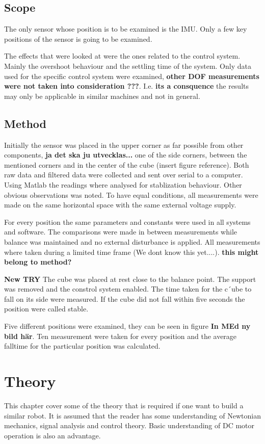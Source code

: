 \documentclass[a4paper,11pt]{kth-mag}
\begin{document}
\section{Scope}
The only sensor whose position is to be examined is the IMU. Only a few key positions of the sensor is going to be examined.

The effects that were looked at were the ones related to the control system. Mainly the overshoot behaviour and the settling time of the system. Only data used for the specific control system were examined, \textbf{other DOF measurements were not taken into consideration ???}. I.e. \textbf{its a consquence} the results may only be applicable in similar machines and not in general.



\section{Method}
Initially the sensor was placed in the upper corner as far possible from other components, \textbf{ja det ska ju utvecklas...} one of the side corners, between the mentioned corners and in the center of the cube (insert figure reference). Both raw data and filtered data were collected and sent over serial to a computer. Using Matlab \cite{MATLAB:2014} the readings where analysed for stablization behaviour. Other obvious observations was noted. To have equal conditions, all measurements were made on the same horizontal space with the same external voltage supply.

For every position the same parameters and constants were used in all systems and software. The comparisons were made in between measurements while balance was maintained and no external disturbance is applied. All measurements where taken during a limited time frame (We dont know this yet....).  \textbf{this might belong to method?}

\textbf{New TRY}
The cube was placed at rest close to the balance point. The support was removed and the constrol system enabled. The time taken for the c´ube to fall on its side were measured. If the cube did not fall within five seconds the position were called stable.

Five different positions were examined, they can be seen in figure \textbf{In MEd ny bild här}. Ten measurement were taken for every position and the average falltime for the particular position was calculated.

\chapter{Theory} \label{chapter: theory}
This chapter cover some of the theory that is required if one want to build a similar robot. It is assumed that the reader has some understanding of Newtonian mechanics, signal analysis and control theory. Basic understanding of DC motor operation is also an advantage.
\end{document}
